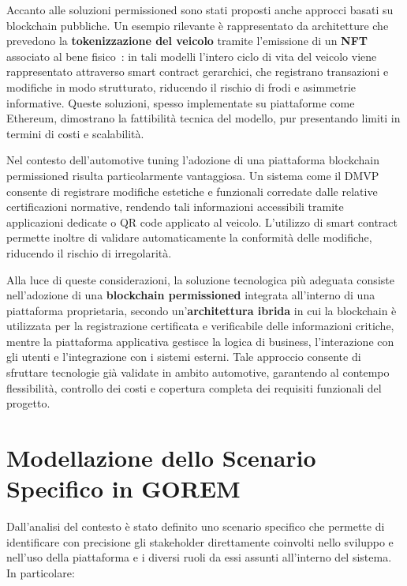 Accanto alle soluzioni permissioned sono stati proposti anche approcci basati su blockchain pubbliche. Un esempio rilevante è rappresentato da architetture che prevedono la \textbf{tokenizzazione del veicolo} tramite l'emissione di un \textbf{NFT} associato al bene fisico~\cite{nftvehicle}: in tali modelli l'intero ciclo di vita del veicolo viene rappresentato attraverso smart contract gerarchici, che registrano transazioni e modifiche in modo strutturato, riducendo il rischio di frodi e asimmetrie informative. Queste soluzioni, spesso implementate su piattaforme come Ethereum, dimostrano la fattibilità tecnica del modello, pur presentando limiti in termini di costi e scalabilità.

Nel contesto dell'automotive tuning l'adozione di una piattaforma blockchain permissioned risulta particolarmente vantaggiosa. Un sistema come il DMVP consente di registrare modifiche estetiche e funzionali corredate dalle relative certificazioni normative, rendendo tali informazioni accessibili tramite applicazioni dedicate o QR code applicato al veicolo. L'utilizzo di smart contract permette inoltre di validare automaticamente la conformità delle modifiche, riducendo il rischio di irregolarità.

Alla luce di queste considerazioni, la soluzione tecnologica più adeguata consiste nell'adozione di una \textbf{blockchain permissioned} integrata all'interno di una piattaforma proprietaria, secondo un'\textbf{architettura ibrida} in cui la blockchain è utilizzata per la registrazione certificata e verificabile delle informazioni critiche, mentre la piattaforma applicativa gestisce la logica di business, l'interazione con gli utenti e l'integrazione con i sistemi esterni. Tale approccio consente di sfruttare tecnologie già validate in ambito automotive, garantendo al contempo flessibilità, controllo dei costi e copertura completa dei requisiti funzionali del progetto.

\section{Modellazione dello Scenario Specifico in GOREM}

Dall'analisi del contesto è stato definito uno scenario specifico che permette di identificare con precisione gli stakeholder direttamente coinvolti nello sviluppo e nell'uso della piattaforma e i diversi ruoli da essi assunti all'interno del sistema. In particolare:

